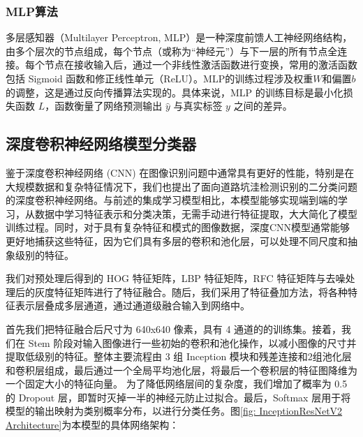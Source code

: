 \documentclass[a4paper, 10pt]{article}
\begin{document}
	\subsubsection{MLP算法}
	
	多层感知器（Multilayer Perceptron, MLP）是一种深度前馈人工神经网络结构，由多个层次的节点组成，每个节点（或称为“神经元”）与下一层的所有节点全连接。每个节点在接收输入后，通过一个非线性激活函数进行变换，常用的激活函数包括 Sigmoid 函数和修正线性单元（ReLU）。MLP的训练过程涉及权重$ W $和偏置$b$的调整，这是通过反向传播算法实现的。具体来说，MLP 的训练目标是最小化损失函数 $L$，函数衡量了网络预测输出 $\hat{y}$ 与真实标签 $y$ 之间的差异\cite{TAO20221}。
	
	
	\subsection{深度卷积神经网络模型分类器}
	
	鉴于深度卷积神经网络 (CNN) 在图像识别问题中通常具有更好的性能，特别是在大规模数据和复杂特征情况下，我们也提出了面向道路坑洼检测识别的二分类问题的深度卷积神经网络。与前述的集成学习模型相比，本模型能够实现端到端的学习，从数据中学习特征表示和分类决策，无需手动进行特征提取，大大简化了模型训练过程。同时，对于具有复杂特征和模式的图像数据，深度CNN模型通常能够更好地捕获这些特征，因为它们具有多层的卷积和池化层，可以处理不同尺度和抽象级别的特征。
	
	我们对预处理后得到的 HOG 特征矩阵，LBP 特征矩阵，RFC 特征矩阵与去噪处理后的灰度特征矩阵进行了特征融合。随后，我们采用了特征叠加方法，将各种特征表示层叠成多层通道，通过通道级融合输入到网络中。
	
	首先我们把特征融合后尺寸为 640x640 像素，具有 4 通道的的训练集。接着，我们在 Stem 阶段对输入图像进行一些初始的卷积和池化操作，以减小图像的尺寸并提取低级别的特征。整体主要流程由 3 组 Inception 模块和残差连接和2组池化层和卷积层组成，最后通过一个全局平均池化层，将最后一个卷积层的特征图降维为一个固定大小的特征向量。
	为了降低网络层间的复杂度，我们增加了概率为 0.5 的 Dropout 层，即暂时灭掉一半的神经元防止过拟合。最后，Softmax 层用于将模型的输出映射为类别概率分布，以进行分类任务。图\ref{fig: InceptionResNetV2 Architecture}为本模型的具体网络架构：
	
\end{document}
